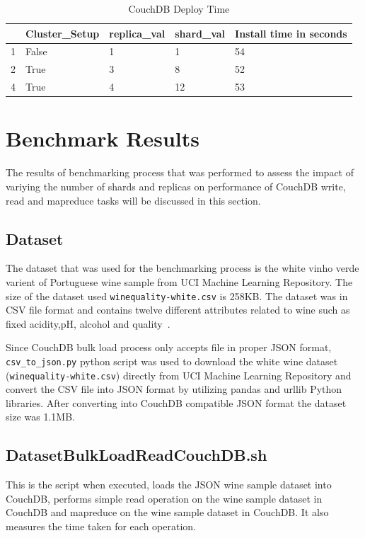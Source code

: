 \begin{table}[]
\centering
\caption{CouchDB Deploy Time}
\label{t:CouchDB-DeployTime}
\begin{tabular}{|l|l|l|l|l|}
\hline
  & \textbf{Cluster\_Setup} & \textbf{replica\_val} & \textbf{shard\_val} & \textbf{Install time in seconds} \\ \hline
1 & False                   & 1                     & 1                   & 54                               \\ \hline
2 & True                    & 3                     & 8                   & 52                               \\ \hline
4 & True                    & 4                     & 12                  & 53                               \\ \hline
\end{tabular}
\end{table}

\section{Benchmark Results}
The results of benchmarking process that was performed to assess the impact of variying
  the number of shards and replicas on performance of CouchDB write,
  read and mapreduce tasks will be discussed in this section. 
\subsection{Dataset}
The dataset that was used for the benchmarking process is the white vinho verde varient of Portuguese wine sample
from UCI Machine Learning Repository. The size of the dataset used \verb|winequality-white.csv| is 258KB. The dataset was in CSV file
format and contains twelve different attributes related to wine such
as fixed acidity,pH, alcohol and quality~\cite{www-WineQuality}. 

Since CouchDB bulk load process only accepts file in proper JSON
format, \verb|csv_to_json.py| python script was used to download the
white wine dataset (\verb|winequality-white.csv|) directly from UCI Machine
Learning Repository and convert the CSV file into JSON format by utilizing
pandas and urllib Python libraries. After converting into CouchDB
compatible JSON format the dataset size was 1.1MB.

\subsection{DatasetBulkLoadReadCouchDB.sh}
This is the script when executed, loads the JSON wine sample dataset
into CouchDB, performs simple read operation on the wine sample
dataset in CouchDB and mapreduce on the wine sample
dataset in CouchDB. It also measures the time taken for each operation.

